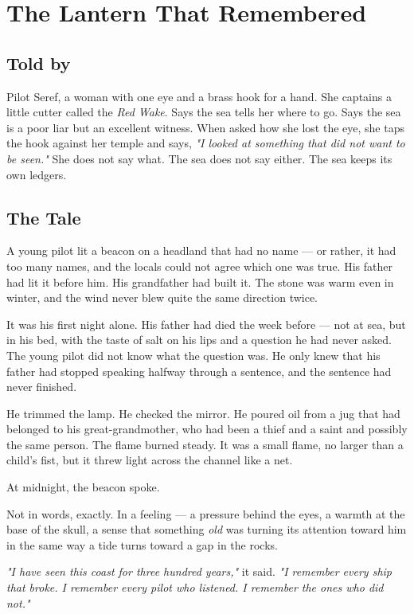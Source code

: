\chapter{The Lantern That Remembered}

\section*{Told by}
Pilot Seref, a woman with one eye and a brass hook for a hand. She captains a little cutter called the \textit{Red Wake}. Says the sea tells her where to go. Says the sea is a poor liar but an excellent witness. When asked how she lost the eye, she taps the hook against her temple and says, \textit{"I looked at something that did not want to be seen."} She does not say what. The sea does not say either. The sea keeps its own ledgers.

\section*{The Tale}

A young pilot lit a beacon on a headland that had no name — or rather, it had too many names, and the locals could not agree which one was true. His father had lit it before him. His grandfather had built it. The stone was warm even in winter, and the wind never blew quite the same direction twice.

It was his first night alone. His father had died the week before — not at sea, but in his bed, with the taste of salt on his lips and a question he had never asked. The young pilot did not know what the question was. He only knew that his father had stopped speaking halfway through a sentence, and the sentence had never finished.

He trimmed the lamp. He checked the mirror. He poured oil from a jug that had belonged to his great-grandmother, who had been a thief and a saint and possibly the same person. The flame burned steady. It was a small flame, no larger than a child's fist, but it threw light across the channel like a net.

At midnight, the beacon spoke.

Not in words, exactly. In a feeling — a pressure behind the eyes, a warmth at the base of the skull, a sense that something \textit{old} was turning its attention toward him in the same way a tide turns toward a gap in the rocks.

\textit{"I have seen this coast for three hundred years,"} it said. \textit{"I remember every ship that broke. I remember every pilot who listened. I remember the ones who did not."}

